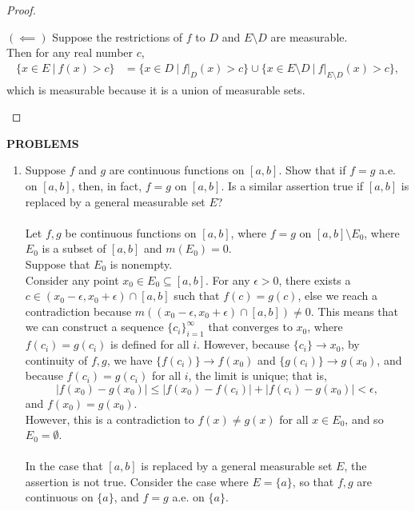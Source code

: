 \begin{flushleft}
\begin{proof}
\begin{enumerate}[label=(\roman*),align=right]
        $(\impliedby)$ Suppose the restrictions of $f$ to $D$ and $E\setminus D$ are measurable.\\
        Then for any real number $c$,
        \begin{align*}
            \{x\in E\ |\ f(x)>c\}&=\{x\in D\ |\ f|_{D}(x)>c\}\cup\{x\in E\setminus D\ |\ f|_{E\setminus D}(x)>c\},
        \end{align*}
        which is measurable because it is a union of measurable sets.
    \end{enumerate}
\end{proof}

\end{flushleft}
\begin{center}
	\textbf{PROBLEMS}
\end{center}
\begin{enumerate}
	\setcounter{enumi}{0}
	\item Suppose $f$ and $g$ are continuous functions on $[a,b]$. Show that if $f=g$ a.e. on $[a,b]$, then, in fact, $f=g$ on $[a,b]$.
    Is a similar assertion true if $[a,b]$ is replaced by a general measurable set $E$?\\
    \\Let $f,g$ be continuous functions on $[a,b]$, where $f=g$ on $[a,b]\setminus E_0$, where $E_0$ is a subset of $[a,b]$ and $m(E_0)=0$.
    \\Suppose that $E_0$ is nonempty.\\
    Consider any point $x_0\in E_0\subseteq[a,b]$. For any $\epsilon>0$, there exists a $c\in(x_0-\epsilon,x_0+\epsilon)\cap[a,b]$ such that $f(c)=g(c)$, else we reach a contradiction because $m((x_0-\epsilon,x_0+\epsilon)\cap[a,b])\neq0$.
    This means that we can construct a sequence $\{c_i\}_{i=1}^\infty$ that converges to $x_0$, where $f(c_i)=g(c_i)$ is defined for all $i$. 
    However, because $\{c_i\}\to x_0$, by continuity of $f,g$, we have $\{f(c_i)\}\to f(x_0)$ and $\{g(c_i)\}\to g(x_0)$, and because $f(c_i)=g(c_i)$ for all $i$, the limit is unique; that is,
    \[
        |f(x_0)-g(x_0)|\le|f(x_0)-f(c_i)|+|f(c_i)-g(x_0)|<\epsilon,
    \]
    and $f(x_0)=g(x_0)$.
    \\However, this is a contradiction to $f(x)\neq g(x)$ for all $x\in E_0$, and so $E_0=\emptyset$.\\
    \\In the case that $[a,b]$ is replaced by a general measurable set $E$, the assertion is not true.
    Consider the case where $E=\{a\}$, so that $f,g$ are continuous on $\{a\}$, and $f=g$ a.e. on $\{a\}$.

\end{enumerate}
